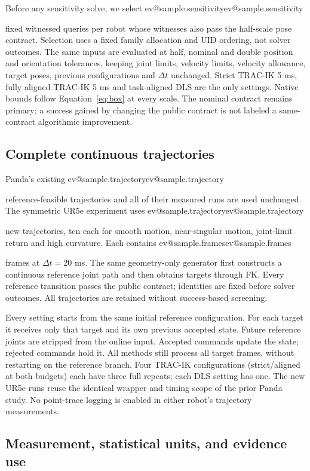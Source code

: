 \documentclass[10pt,a4paper]{article}
\makeatletter
\newcommand{\ev}[1]{\ifcsname ev@#1\endcsname\csname ev@#1\endcsname\else\PackageError{evidence}{Undefined evidence key #1}{}\fi}
\makeatother
\begin{document}
Before any sensitivity solve, we select \ev{sample.sensitivity} fixed witnessed
queries per robot whose witnesses also pass the half-scale pose contract.
Selection uses a fixed family allocation and UID ordering, not solver outcomes.
The same inputs are evaluated at half, nominal and double position and
orientation tolerances, keeping joint limits, velocity limits, velocity allowance,
target poses, previous configurations and $\Delta t$ unchanged.
Strict TRAC-IK 5 ms, fully aligned TRAC-IK 5 ms and task-aligned DLS are the only
settings. Native bounds follow Equation~\eqref{eq:box} at every scale.
The nominal contract remains primary; a success gained by changing the public
contract is not labeled a same-contract algorithmic improvement.

\subsection{Complete continuous trajectories}

Panda's existing \ev{sample.trajectory} reference-feasible trajectories and all
of their measured runs are used unchanged. The symmetric UR5e experiment uses
\ev{sample.trajectory} new trajectories, ten each for smooth motion,
near-singular motion, joint-limit return and high curvature.
Each contains \ev{sample.frames} frames at $\Delta t=20$ ms.
The same geometry-only generator first constructs a continuous reference
joint path and then obtains targets through FK. Every reference transition
passes the public contract; identities are fixed before solver outcomes.
All trajectories are retained without success-based screening.

Every setting starts from the same initial reference configuration.
For each target it receives only that target and its own previous accepted
state. Future reference joints are stripped from the online input.
Accepted commands update the state; rejected commands hold it.
All methods still process all target frames, without restarting on the
reference branch. Four TRAC-IK configurations (strict/aligned at both budgets)
each have three full repeats; each DLS setting has one.
The new UR5e runs reuse the identical wrapper and timing scope of the prior
Panda study. No point-trace logging is enabled in either robot's trajectory
measurements.

\subsection{Measurement, statistical units, and evidence use}
\end{document}
